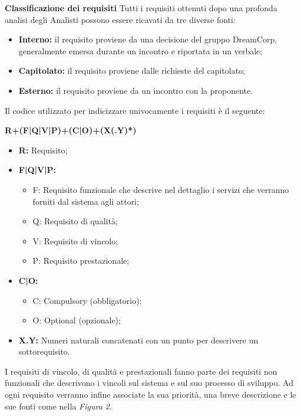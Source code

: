 	    \textbf{Classificazione dei requisiti} Tutti i requisiti ottenuti dopo una profonda analisi degli Analisti possono essere ricavati da tre diverse fonti:\newline
	    \begin{itemize}
	    	\item \textbf{Interno:} il requisito proviene da una decisione del gruppo DreamCorp, generalmente emersa durante un incontro e riportata in un verbale;
	    	\item \textbf{Capitolato:} il requisito proviene dalle richieste del capitolato;
	    	\item \textbf{Esterno:} il requisito proviene da un incontro con la proponente.\newline
	    \end{itemize}
	    Il codice utilizzato per indicizzare univocamente i requisiti è il seguente:\newline
	    \begin{center}
	    	\textbf{R+(F|Q|V|P)+(C|O)+(X(.Y)*)}
	    \end{center}
	    \begin{itemize}
	    	\item \textbf{R:} Requisito;
	    	\item \textbf{F|Q|V|P:}
	    	\begin{itemize}
	    		\item F: Requisito funzionale che descrive nel dettaglio i servizi che verranno forniti dal sistema agli attori;
	    		\item Q: Requisito di qualità;
	    		\item V: Requisito di vincolo;
	    		\item P: Requisito prestazionale;
	    	\end{itemize}
	    	\item \textbf{C|O:}
	    	\begin{itemize}
	    		\item C: Compulsory (obbligatorio);
	    		\item O: Optional (opzionale);
	    	\end{itemize}
	    	\item \textbf{X.Y:} Numeri naturali concatenati con un punto per descrivere un sottorequisito.\newline
	    \end{itemize}
	    I requisiti di vincolo, di qualità e prestazionali fanno parte dei requisiti non funzionali che descrivono i vincoli sul sistema e sul suo processo di sviluppo.
	    Ad ogni requisito verranno infine associate la sua priorità, una breve descrizione e le sue fonti come nella \textit{Figura 2}.\newline
	    
